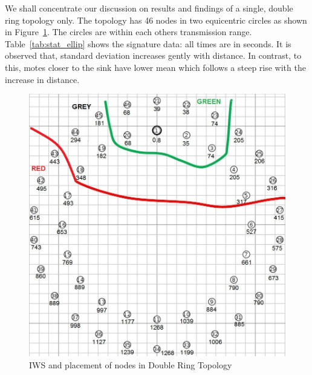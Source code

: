 \documentclass[conference]{IEEEtran}
\begin{document}
We shall concentrate our discussion on results and findings of a single, double ring topology only.
The topology has 46 nodes in two equicentric circles as shown  in Figure~\ref{fig:elliptopo}.
The circles are within each others transmission range.
Table~\ref{tab:stat_ellip} shows the signature data: all times are in seconds.
It is observed that, standard deviation increases gently with distance.
In contrast, to this, %
motes closer to the sink have lower mean which follows a steep rise with the increase in distance.


\begin{figure}[t]
    \centering
        \includegraphics[width=0.7\linewidth]{DoubleRingZ}
        \caption{IWS and placement of nodes in Double Ring Topology}
        \label{fig:elliptopo} 
    \end{figure}
\end{document}
